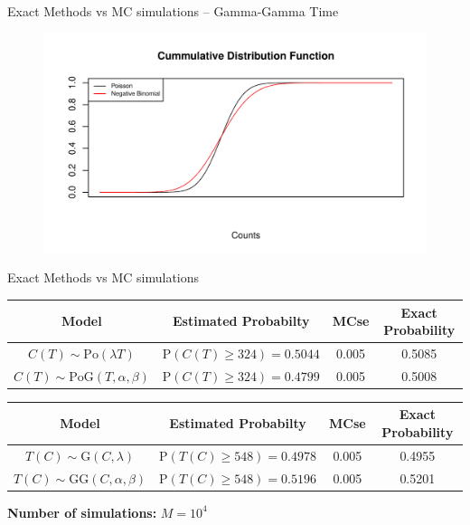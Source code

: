 \documentclass[english]{beamer}\usepackage[]{graphicx}\usepackage[]{xcolor}
\makeatletter
\def\maxwidth{ %
  \ifdim\Gin@nat@width>\linewidth
    \linewidth
  \else
    \Gin@nat@width
  \fi
}
\newenvironment{knitrout}{}{} %
\makeatother
\begin{document}
\begin{frame}{Exact Methods vs MC simulations -- Gamma-Gamma Time}
\begin{figure}
\begin{knitrout}
\color{fgcolor}
\includegraphics[width=\maxwidth]{figures/figunnamed-chunk-15-1} 
\end{knitrout}
\end{figure}
\end{frame}

\begin{frame}[shrink=20]{Exact Methods vs MC simulations}

\begin{table}[h!]
\centering
\begin{tabular}{cccc}
 \textbf{Model} & \textbf{Estimated Probabilty} & \textbf{MCse} & \textbf{Exact Probability} \\
\hline
\hline
 $C(T)\sim\textrm{Po}(\lambda T)$ & $\textrm{P}(C(T)\geq 324) = 0.5044$ & 0.005 & 0.5085 \\
 $C(T)\sim\textrm{PoG}(T, \alpha, \beta)$ & $\textrm{P}(C(T)\geq 324) = 0.4799$ & 0.005 & 0.5008 
\end{tabular}
\end{table}

\begin{table}[h!]
\centering
\begin{tabular}{cccc}
 \textbf{Model} & \textbf{Estimated Probabilty} & \textbf{MCse} & \textbf{Exact Probability} \\
\hline
\hline
 $T(C)\sim\textrm{G}(C, \lambda)$& $\textrm{P}(T(C)\geq 548) = 0.4978$ & 0.005 & 0.4955\\
$T(C)\sim\textrm{GG}(C, \alpha, \beta)$ & $\textrm{P}(T(C)\geq 548) = 0.5196$ & 0.005 & 0.5201
\end{tabular}
\end{table}
\textbf{Number of simulations:} $M=10^4$
\end{frame}
\end{document}
